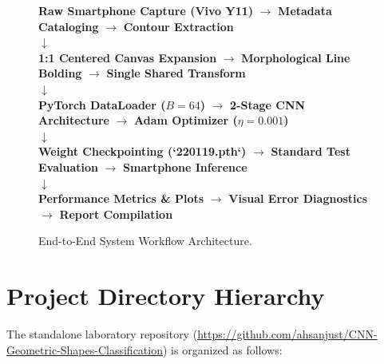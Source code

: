\documentclass[11pt,a4paper,oneside]{report}
\begin{document}
\begin{figure}[H]
    \centering
    \begin{tcolorbox}[colback=codebg,colframe=primary,title=\textbf{System Execution Pipeline Flowchart}]
    \textbf{Raw Smartphone Capture (Vivo Y11)} $\to$ \textbf{Metadata Cataloging} $\to$ \textbf{Contour Extraction} \\
    $\downarrow$ \\
    \textbf{1:1 Centered Canvas Expansion} $\to$ \textbf{Morphological Line Bolding} $\to$ \textbf{Single Shared Transform} \\
    $\downarrow$ \\
    \textbf{PyTorch DataLoader ($B=64$)} $\to$ \textbf{2-Stage CNN Architecture} $\to$ \textbf{Adam Optimizer ($\eta=0.001$)} \\
    $\downarrow$ \\
    \textbf{Weight Checkpointing (`220119.pth`)} $\to$ \textbf{Standard Test Evaluation} $\to$ \textbf{Smartphone Inference} \\
    $\downarrow$ \\
    \textbf{Performance Metrics \& Plots} $\to$ \textbf{Visual Error Diagnostics} $\to$ \textbf{Report Compilation}
    \end{tcolorbox}
    \caption{End-to-End System Workflow Architecture.}
    \label{fig:system_workflow}
\end{figure}

\section{Project Directory Hierarchy}
The standalone laboratory repository (\url{https://github.com/ahsanjust/CNN-Geometric-Shapes-Classification}) is organized as follows:
\end{document}
